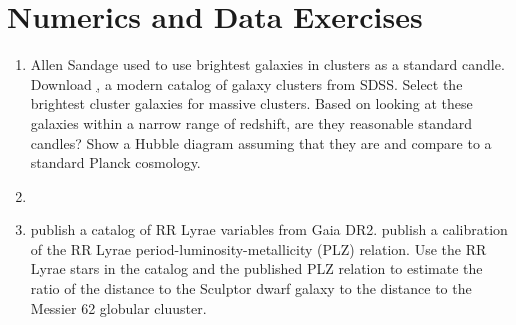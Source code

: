 \section{Numerics and Data Exercises}

\begin{enumerate}
\item Allen Sandage used to use brightest galaxies in clusters as a
   standard
   candle. Download \href{https://cdsarc.cds.unistra.fr/viz-bin/cat/J/ApJS/224/1#/description},
   a modern catalog of galaxy clusters from SDSS. Select the brightest
   cluster galaxies for massive clusters. Based on looking at these
   galaxies within a narrow range of redshift, are they reasonable
   standard candles? Show a Hubble diagram assuming that they are and
   compare to a standard Planck cosmology.
\item 
\item \citet{clementini18a} publish a catalog of RR Lyrae variables
   from Gaia DR2. \citet{muraveva18a} publish a calibration of the RR
   Lyrae period-luminosity-metallicity (PLZ) relation. Use the RR
   Lyrae stars in the catalog and the published PLZ relation to
   estimate the ratio of the distance to the Sculptor dwarf galaxy to
   the distance to the Messier 62 globular cluuster.
\end{enumerate}


  

